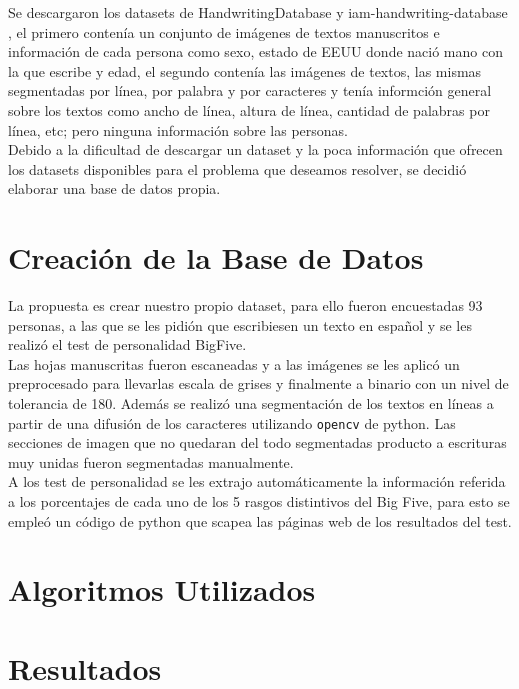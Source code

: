 \documentclass[10pt, a4paper]{article}
\begin{document}
Se descargaron los datasets de HandwritingDatabase \cite{15} y iam-handwriting-database \cite{16}, el primero conten\'ia un conjunto de im\'agenes de textos manuscritos e informaci\'on de cada persona como sexo, estado de EEUU donde naci\'o 
mano con la que escribe y edad, el segundo conten\'ia las im\'agenes de textos, las mismas segmentadas por l\'inea, por palabra y por caracteres y ten\'ia informci\'on general sobre los textos como 
ancho de l\'inea, altura de l\'inea, cantidad de palabras por l\'inea, etc; pero ninguna informaci\'on sobre las personas. \\ 

Debido a la dificultad de descargar un dataset y la poca informaci\'on que ofrecen los datasets disponibles para el problema que deseamos resolver, se decidi\'o elaborar una base de datos propia.

\section{Creaci\'on de la Base de Datos}

La propuesta es crear nuestro propio dataset, para ello fueron encuestadas 93 personas, a las que se les pidi\'on que escribiesen un texto 
en espa\~nol y se les realiz\'o el test de personalidad BigFive. \\ 

Las hojas manuscritas fueron escaneadas y a las im\'agenes se les aplic\'o un preprocesado para llevarlas escala de grises y finalmente a binario con un nivel de tolerancia de 180. Adem\'as se 
realiz\'o una segmentaci\'on de los textos en l\'ineas a partir de una difusi\'on de los caracteres utilizando \texttt{opencv} de python. Las secciones de imagen que no quedaran 
del todo segmentadas producto a escrituras muy unidas fueron segmentadas manualmente.\\ 

A los test de personalidad se les extrajo autom\'aticamente la informaci\'on referida a los porcentajes de cada uno 
de los 5 rasgos distintivos del Big Five, para esto se emple\'o un c\'odigo de python que scapea las p\'aginas web de los resultados del test.\\ 


\section{Algoritmos Utilizados}
\section{Resultados}
\end{document}
